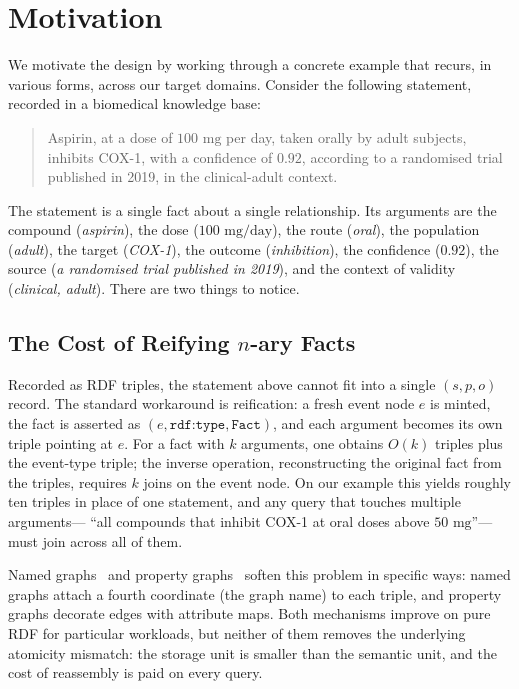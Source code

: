 \section{Motivation}
\label{sec:motivation}

We motivate the design by working through a concrete example that recurs, in
various forms, across our target domains. Consider the following statement,
recorded in a biomedical knowledge base:

\begin{quote}
Aspirin, at a dose of $100\text{ mg}$ per day, taken orally by adult subjects,
inhibits COX-1, with a confidence of $0.92$, according to a randomised trial
published in 2019, in the clinical-adult context.
\end{quote}

The statement is a single fact about a single relationship. Its arguments are
the compound (\emph{aspirin}), the dose ($100\text{ mg/day}$), the route
(\emph{oral}), the population (\emph{adult}), the target (\emph{COX-1}), the
outcome (\emph{inhibition}), the confidence ($0.92$), the source (\emph{a
randomised trial published in 2019}), and the context of validity
(\emph{clinical, adult}). There are two things to notice.

\subsection{The Cost of Reifying $n$-ary Facts}
\label{sec:motivation:triples}

Recorded as RDF triples, the statement above cannot fit into a single
$(s, p, o)$ record. The standard workaround is reification: a fresh event node
$e$ is minted, the fact is asserted as $(e, \texttt{rdf:type}, \texttt{Fact})$,
and each argument becomes its own triple pointing at $e$. For a fact with
$k$ arguments, one obtains $O(k)$ triples plus the event-type triple; the
inverse operation, reconstructing the original fact from the triples, requires
$k$ joins on the event node. On our example this yields roughly ten triples in
place of one statement, and any query that touches multiple arguments--- ``all
compounds that inhibit COX-1 at oral doses above $50\text{ mg}$''---must join
across all of them.

Named graphs~\cite{carroll2005named} and property graphs~\cite{angles2017property}
soften this problem in specific ways: named graphs attach a fourth coordinate
(the graph name) to each triple, and property graphs decorate edges with
attribute maps. Both mechanisms improve on pure RDF for particular workloads,
but neither of them removes the underlying atomicity mismatch: the storage
unit is smaller than the semantic unit, and the cost of reassembly is paid
on every query.

